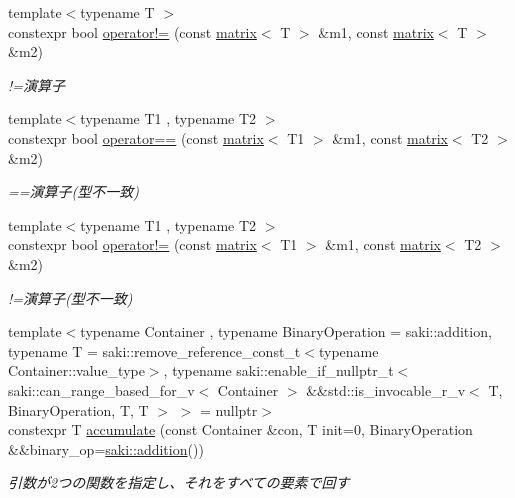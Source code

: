 \begin{DoxyCompactItemize}
{\footnotesize template$<$typename T $>$ }\\constexpr bool \mbox{\hyperlink{namespacesaki_a76722addb100e11d9eb9370ced3b027c}{operator!=}} (const \mbox{\hyperlink{classsaki_1_1matrix}{matrix}}$<$ T $>$ \&m1, const \mbox{\hyperlink{classsaki_1_1matrix}{matrix}}$<$ T $>$ \&m2)
\begin{DoxyCompactList}\small\item\em !=演算子 \end{DoxyCompactList}\item 
{\footnotesize template$<$typename T1 , typename T2 $>$ }\\constexpr bool \mbox{\hyperlink{namespacesaki_a1ffbf8122dda5209dc384e64747bec32}{operator==}} (const \mbox{\hyperlink{classsaki_1_1matrix}{matrix}}$<$ T1 $>$ \&m1, const \mbox{\hyperlink{classsaki_1_1matrix}{matrix}}$<$ T2 $>$ \&m2)
\begin{DoxyCompactList}\small\item\em ==演算子(型不一致) \end{DoxyCompactList}\item 
{\footnotesize template$<$typename T1 , typename T2 $>$ }\\constexpr bool \mbox{\hyperlink{namespacesaki_a4bef07cf55a40a115c89e6e20406b124}{operator!=}} (const \mbox{\hyperlink{classsaki_1_1matrix}{matrix}}$<$ T1 $>$ \&m1, const \mbox{\hyperlink{classsaki_1_1matrix}{matrix}}$<$ T2 $>$ \&m2)
\begin{DoxyCompactList}\small\item\em !=演算子(型不一致) \end{DoxyCompactList}\item 
{\footnotesize template$<$typename Container , typename Binary\+Operation  = saki\+::addition, typename T  = saki\+::remove\+\_\+reference\+\_\+const\+\_\+t$<$typename Container\+::value\+\_\+type$>$, typename saki\+::enable\+\_\+if\+\_\+nullptr\+\_\+t$<$ saki\+::can\+\_\+range\+\_\+based\+\_\+for\+\_\+v$<$ Container $>$ \&\&std\+::is\+\_\+invocable\+\_\+r\+\_\+v$<$ T, Binary\+Operation, T, T $>$ $>$  = nullptr$>$ }\\constexpr T \mbox{\hyperlink{namespacesaki_a6f2ea69ef5e31c8004ba36bb10384333}{accumulate}} (const Container \&con, T init=0, Binary\+Operation \&\&binary\+\_\+op=\mbox{\hyperlink{structsaki_1_1addition}{saki\+::addition}}())
\begin{DoxyCompactList}\small\item\em 引数が2つの関数を指定し、それをすべての要素で回す \end{DoxyCompactList}\item 

\end{DoxyCompactItemize}
